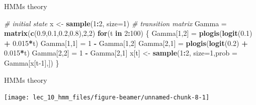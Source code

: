 \documentclass[
  ignorenonframetext,
]{beamer}
\newenvironment{Shaded}{\begin{snugshade}}{\end{snugshade}}
\newcommand{\CommentTok}[1]{\textcolor[rgb]{0.56,0.35,0.01}{\textit{#1}}}
\newcommand{\ControlFlowTok}[1]{\textcolor[rgb]{0.13,0.29,0.53}{\textbf{#1}}}
\newcommand{\DataTypeTok}[1]{\textcolor[rgb]{0.13,0.29,0.53}{#1}}
\newcommand{\DecValTok}[1]{\textcolor[rgb]{0.00,0.00,0.81}{#1}}
\newcommand{\FloatTok}[1]{\textcolor[rgb]{0.00,0.00,0.81}{#1}}
\newcommand{\KeywordTok}[1]{\textcolor[rgb]{0.13,0.29,0.53}{\textbf{#1}}}
\newcommand{\NormalTok}[1]{#1}
\newcommand{\OperatorTok}[1]{\textcolor[rgb]{0.81,0.36,0.00}{\textbf{#1}}}
\newcommand{\StringTok}[1]{\textcolor[rgb]{0.31,0.60,0.02}{#1}}
\begin{document}
\begin{frame}[fragile]{HMMs theory}
\protect\hypertarget{hmms-theory-3}{}

\begin{Shaded}
\begin{Highlighting}[]
\CommentTok{# initial state}
\NormalTok{x <-}\StringTok{ }\KeywordTok{sample}\NormalTok{(}\DecValTok{1}\OperatorTok{:}\DecValTok{2}\NormalTok{, }\DataTypeTok{size=}\DecValTok{1}\NormalTok{)}
\CommentTok{# transition matrix}
\NormalTok{Gamma =}\StringTok{ }\KeywordTok{matrix}\NormalTok{(}\KeywordTok{c}\NormalTok{(}\FloatTok{0.9}\NormalTok{,}\FloatTok{0.1}\NormalTok{,}\FloatTok{0.2}\NormalTok{,}\FloatTok{0.8}\NormalTok{),}\DecValTok{2}\NormalTok{,}\DecValTok{2}\NormalTok{)}
\ControlFlowTok{for}\NormalTok{(t }\ControlFlowTok{in} \DecValTok{2}\OperatorTok{:}\DecValTok{100}\NormalTok{) \{}
\NormalTok{  Gamma[}\DecValTok{1}\NormalTok{,}\DecValTok{2}\NormalTok{] =}\StringTok{ }\KeywordTok{plogis}\NormalTok{(}\KeywordTok{logit}\NormalTok{(}\FloatTok{0.1}\NormalTok{) }\OperatorTok{+}\StringTok{ }\FloatTok{0.015}\OperatorTok{*}\NormalTok{t)}
\NormalTok{  Gamma[}\DecValTok{1}\NormalTok{,}\DecValTok{1}\NormalTok{] =}\StringTok{ }\DecValTok{1} \OperatorTok{-}\StringTok{ }\NormalTok{Gamma[}\DecValTok{1}\NormalTok{,}\DecValTok{2}\NormalTok{]}
\NormalTok{  Gamma[}\DecValTok{2}\NormalTok{,}\DecValTok{1}\NormalTok{] =}\StringTok{ }\KeywordTok{plogis}\NormalTok{(}\KeywordTok{logit}\NormalTok{(}\FloatTok{0.2}\NormalTok{) }\OperatorTok{+}\StringTok{ }\FloatTok{0.015}\OperatorTok{*}\NormalTok{t)}
\NormalTok{  Gamma[}\DecValTok{2}\NormalTok{,}\DecValTok{2}\NormalTok{] =}\StringTok{ }\DecValTok{1} \OperatorTok{-}\StringTok{ }\NormalTok{Gamma[}\DecValTok{2}\NormalTok{,}\DecValTok{1}\NormalTok{]}
\NormalTok{  x[t] <-}\StringTok{ }\KeywordTok{sample}\NormalTok{(}\DecValTok{1}\OperatorTok{:}\DecValTok{2}\NormalTok{, }\DataTypeTok{size=}\DecValTok{1}\NormalTok{,}\DataTypeTok{prob =}\NormalTok{ Gamma[x[t}\DecValTok{-1}\NormalTok{],])}
\NormalTok{\}}
\end{Highlighting}
\end{Shaded}

\end{frame}

\begin{frame}{HMMs theory}
\protect\hypertarget{hmms-theory-4}{}

\begin{center}\texttt{[image: lec\_10\_hmm\_files/figure-beamer/unnamed-chunk-8-1]} \end{center}

\end{frame}
\end{document}

